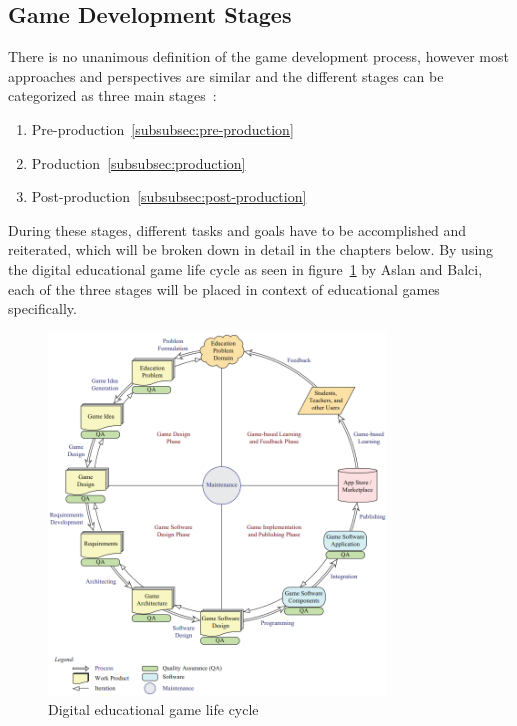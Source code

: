 \subsection{Game Development Stages}\label{subsec:game-design-stages}
There is no unanimous definition of the game development process, however most approaches and perspectives are similar and the different
stages can be categorized as three main stages~\cite{cg:game-design-stages}:
\begin{enumerate}
    \item Pre-production~\ref{subsubsec:pre-production}
    \item Production~\ref{subsubsec:production}
    \item Post-production~\ref{subsubsec:post-production}
\end{enumerate}
During these stages, different tasks and goals have to be accomplished and reiterated, which will be broken down in detail in the chapters below.
By using the digital educational game life cycle as seen in figure~\ref{fig:deglc} by Aslan and Balci, each of the three stages will be placed in context of
educational games specifically.
\begin{figure}
    \centering
    \includegraphics[width=0.8\textwidth]{Pictures/res/fundamentals/deglc}
    \caption{Digital educational game life cycle~\cite{GAMED}}
    \label{fig:deglc}
\end{figure}

